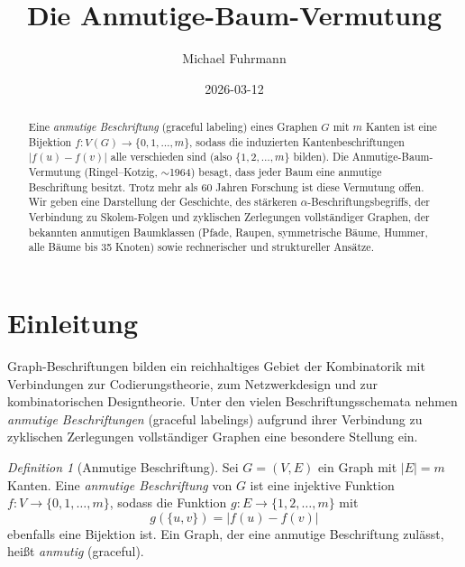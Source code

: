 \documentclass[12pt,a4paper]{amsart}
\theoremstyle{definition}
\theoremstyle{remark}
\newtheorem{definition_de}[theorem]{Definition}
\begin{document}
\begin{abstract}
Eine \emph{anmutige Beschriftung} (graceful labeling) eines Graphen $G$ mit $m$
Kanten ist eine Bijektion $f: V(G) \to \{0, 1, \ldots, m\}$, sodass die induzierten
Kantenbeschriftungen $|f(u) - f(v)|$ alle verschieden sind (also
$\{1, 2, \ldots, m\}$ bilden). Die Anmutige-Baum-Vermutung (Ringel--Kotzig,
$\sim$1964) besagt, dass jeder Baum eine anmutige Beschriftung besitzt. Trotz
mehr als 60 Jahren Forschung ist diese Vermutung offen. Wir geben eine Darstellung
der Geschichte, des stärkeren $\alpha$-Beschriftungsbegriffs, der Verbindung zu
Skolem-Folgen und zyklischen Zerlegungen vollständiger Graphen, der bekannten
anmutigen Baumklassen (Pfade, Raupen, symmetrische Bäume, Hummer, alle Bäume bis
35 Knoten) sowie rechnerischer und struktureller Ansätze.
\end{abstract}

\title{Die Anmutige-Baum-Vermutung}

\author{Michael Fuhrmann}
\address{Specialist Mathematics Project, Build 164}
\date{2026-03-12}

\maketitle

\tableofcontents

\section{Einleitung}

Graph-Beschriftungen bilden ein reichhaltiges Gebiet der Kombinatorik mit Verbindungen
zur Codierungstheorie, zum Netzwerkdesign und zur kombinatorischen Designtheorie.
Unter den vielen Beschriftungsschemata nehmen \emph{anmutige Beschriftungen} (graceful
labelings) aufgrund ihrer Verbindung zu zyklischen Zerlegungen vollständiger Graphen
eine besondere Stellung ein.

\begin{definition_de}[Anmutige Beschriftung]\label{def:anmutig}
Sei $G = (V, E)$ ein Graph mit $|E| = m$ Kanten. Eine \emph{anmutige Beschriftung}
von $G$ ist eine injektive Funktion $f: V \to \{0, 1, \ldots, m\}$, sodass die Funktion
$g: E \to \{1, 2, \ldots, m\}$ mit
\[
  g(\{u,v\}) = |f(u) - f(v)|
\]
ebenfalls eine Bijektion ist. Ein Graph, der eine anmutige Beschriftung zulässt,
heißt \emph{anmutig} (graceful).
\end{definition_de}
\end{document}
